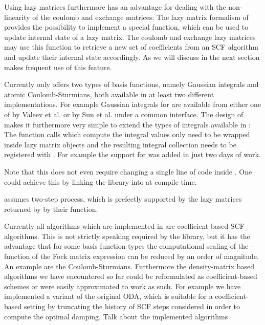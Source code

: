 Using lazy matrices furthermore has an advantage for
dealing with the non-linearity of the coulomb and exchange matrices:
The lazy matrix formalism of \lazyten provides the possibility
to implement a special \update function,
which can be used to update internal state of a lazy matrix.
The coulomb and exchange lazy matrices
may use this function to retrieve a new set of coefficients from an
SCF algorithm and update
their internal state accordingly.
As we will discuss in the next section \gscf makes frequent use of this feature.

Currently \gint only offers two types of basis functions,
namely Gaussian integrals and atomic Coulomb-Sturmians,
both available in at least two different implementations.
For example Gaussian integrals for \gint are available from either one of 
\libint by Valeev et al.\cite{Libint2,Libint2_231}
or \libcint by Sun et al. 
under a common interface.
The design of \gint makes it furthermore very simple to extend the types of integrals
available in \molsturm:
The function calls which compute the integral values only need to be wrapped
inside lazy matrix objects and the resulting integral collection needs to be registered
with \gint.
For example the support for \libcint was added in just two days of work.

Note that this does not even require changing a single line of code inside \gint.
One could achieve this by linking the library into \molsturm at compile time.

\gscf assumes two-step \SCF process,
which is prefectly supported by the lazy matrices returned by \gint
by their \update function.

Currently all algorithms which are implemented in \gscf are coefficient-based SCF algorithms.
This is not strictly speaking required by the library,
but it has the advantage that for some basis function types
the computational scaling of the \contraction-function
of the Fock matrix expression can be reduced by an order of magnitude.
An example are the Coulomb-Sturmians.
Furthermore the density-matrix based algorithms
we have encountered so far could be reformulated as coefficient-based schemes
or were easily approximated to work as such.
For example we have implemented a variant of the original ODA,
which is suitable for a coefficient-based setting by truncating
the history of SCF steps considered in order to compute the optimal damping.
Talk about the implemented algorithms

